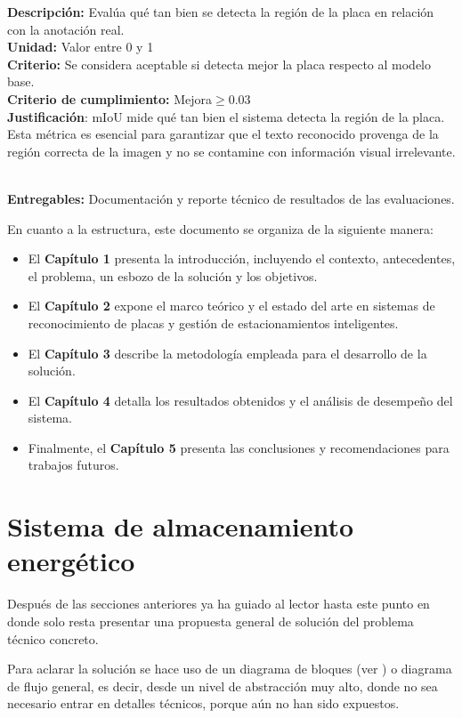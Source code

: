 \begin{enumerate}
\begin{enumerate}
				\textbf{Descripción:} Evalúa qué tan bien se detecta la región de la placa en relación con la anotación real. \\
				\textbf{Unidad:} Valor entre 0 y 1 \\
				\textbf{Criterio:} Se considera aceptable si detecta mejor la placa respecto al modelo base. \\
				\textbf{Criterio de cumplimiento:} Mejora$\geq0.03$ \\
				\textbf{Justificación}:  mIoU mide qué tan bien el sistema detecta la región de la placa.
				Esta métrica es esencial para garantizar que el texto reconocido provenga de la región correcta
				de la imagen y no se contamine con información visual irrelevante.\\ \\
		\end{enumerate}

		\textbf{Entregables:} Documentación y reporte técnico de resultados de las evaluaciones.
\end{enumerate}

En cuanto a la estructura, este documento se organiza de la siguiente manera:
\begin{itemize}
    \item El \textbf{Capítulo 1} presenta la introducción, incluyendo el contexto, 
		antecedentes, el problema, un esbozo de la solución y los objetivos.
    \item El \textbf{Capítulo 2} expone el marco teórico y el estado del arte en sistemas
		de reconocimiento de placas y gestión de estacionamientos inteligentes.
    \item El \textbf{Capítulo 3} describe la metodología empleada para el desarrollo de la solución.
    \item El \textbf{Capítulo 4} detalla los resultados obtenidos y el análisis de desempeño del sistema.
    \item Finalmente, el \textbf{Capítulo 5} presenta las conclusiones y recomendaciones para trabajos futuros.
\end{itemize}


\section{Sistema de almacenamiento energético}

Después de las secciones anteriores ya ha guiado al lector hasta este
punto en donde solo resta presentar una propuesta general de solución
del problema técnico concreto.

Para aclarar la solución se hace uso de un diagrama de bloques (ver
) o diagrama de flujo general, es decir,
desde un nivel de abstracción muy alto, donde no sea necesario entrar
en detalles técnicos, porque aún no han sido expuestos.

